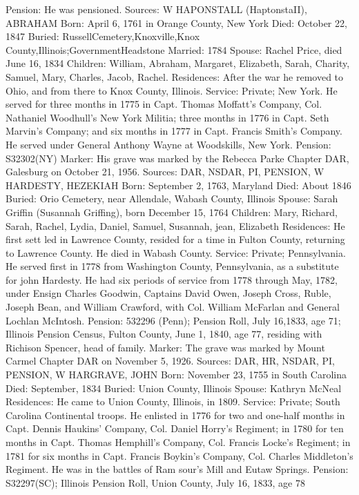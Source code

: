 Pension: He was pensioned. 
Sources: W 
HAPONSTALL (HaptonstaII), ABRAHAM 
Born: April 6, 1761 in Orange County, New York 
Died: October 22, 1847 
Buried: RussellCemetery,Knoxville,Knox County,Illinois;GovernmentHeadstone 
Married: 1784 
Spouse: Rachel Price, died June 16, 1834 
Children: William, Abraham, Margaret, Elizabeth, Sarah, Charity, Samuel, Mary, Charles, Jacob, Rachel. Residences: After the war he removed to Ohio, and from there to Knox County, Illinois. Service: Private; New York. He served for three months in 1775 in Capt. Thomas Moffatt's Company, Col. Nathaniel Woodhull's New York Militia; three months in 1776 in Capt. Seth Marvin's Company; and six months in 1777 in Capt. Francis Smith's Company. He served under General Anthony Wayne at Woodskills, New York. Pension: S32302(NY) 
Marker: His grave was marked by the Rebecca Parke Chapter DAR, Galesburg on October 21, 1956. 
Sources: DAR, NSDAR, PI, PENSION, W 
HARDESTY, HEZEKIAH 
Born: September 2, 1763, Maryland 
Died: About 1846 
Buried: Orio Cemetery, near Allendale, Wabash County, Illinois 
Spouse: Sarah Griffin (Susannah Griffing), born December 15, 1764 
Children: Mary, Richard, Sarah, Rachel, Lydia, Daniel, Samuel, Susannah, jean, Elizabeth 
Residences: He first sett led in Lawrence County, resided for a time in Fulton County, returning to Lawrence County. He died in Wabash County. 
Service: Private; Pennsylvania. He served first in 1778 from Washington County, Pennsylvania, as a substitute for john Hardesty. He had six periods of service from 1778 through May, 1782, under Ensign Charles Goodwin, Captains David Owen, Joseph Cross, Ruble, Joseph Bean, and William Crawford, with Col. William McFarlan and General Lochlan McIntosh. 
Pension: 532296 (Penn); Pension Roll, July 16,1833, age 71; Illinois Pension Cen­sus, Fulton County, June 1, 1840, age 77, residing with Richison Spencer, head of family. 
Marker: The grave was marked by Mount Carmel Chapter DAR on November 5, 1926. 
Sources: DAR, HR, NSDAR, PI, PENSION, W 
HARGRAVE, JOHN 
Born: November 23, 1755 in South Carolina 
Died: September, 1834 
Buried: Union County, Illinois 
Spouse: Kathryn McNeal 
Residences: He came to Union County, Illinois, in 1809. 
Service: Private; South Carolina Continental troops. He enlisted in 1776 for two and one-half months in Capt. Dennis Haukins' Company, Col. Daniel Horry's Regiment; in 1780 for ten months in Capt. Thomas Hemphill's Company, Col. Francis Locke's Regiment; in 1781 for six months in Capt. Francis Boykin's Company, Col. Charles Middleton's Regiment. He was in the battles of Ram sour's Mill and Eutaw Springs. Pension: S32297(SC); Illinois Pension Roll, Union County, July 16, 1833, age 78 
